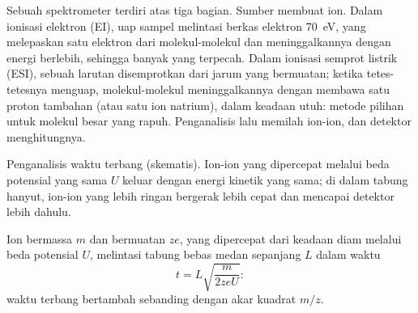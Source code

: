Sebuah spektrometer terdiri atas tiga bagian. Sumber membuat ion. Dalam
ionisasi elektron (EI), uap sampel melintasi berkas elektron
\qty{70}{eV}, yang melepaskan satu elektron dari molekul-molekul dan
meninggalkannya dengan energi berlebih, sehingga banyak yang terpecah. Dalam
ionisasi semprot listrik (ESI), sebuah larutan disemprotkan dari jarum yang
bermuatan; ketika tetes-tetesnya menguap, molekul-molekul meninggalkannya
dengan membawa satu proton tambahan (atau satu ion natrium), dalam keadaan
utuh: metode pilihan untuk molekul besar yang rapuh. Penganalisis lalu
memilah ion-ion, dan detektor menghitungnya.

\begin{omfigure}
\par\vspace{4pt}

{\small Penganalisis waktu terbang (skematis). Ion-ion yang dipercepat melalui
beda potensial yang sama
$U$ keluar dengan energi kinetik yang sama; di dalam tabung hanyut,
ion-ion yang lebih ringan bergerak lebih cepat dan mencapai detektor lebih
dahulu.}
\end{omfigure}

\begin{proposition}\label{prop:b2:mass-spec-atomic:time-of-flight}
Ion bermassa $m$ dan bermuatan $ze$, yang dipercepat dari keadaan diam
melalui beda potensial $U$, melintasi tabung bebas medan sepanjang $L$
dalam waktu
\begin{equation*}
t = L\sqrt{\frac{m}{2zeU}}:
\end{equation*}
waktu terbang bertambah sebanding dengan akar kuadrat $m/z$.
\end{proposition}

